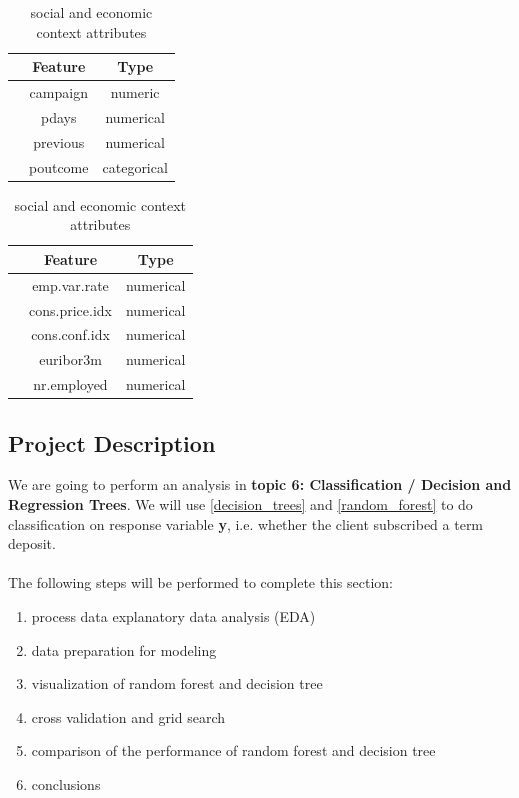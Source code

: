 \documentclass[11pt,a4paper]{article}
\newcounter{magicrownumbers}
\newcommand\rownumber{\stepcounter{magicrownumbers}\arabic{magicrownumbers}}
\begin{document}
    \begin{table}[h]
        \begin{minipage}{.5\linewidth}
            \centering
            \begin{tabular}{r c c}
                 & Feature & Type \\
                \hline \hline
                \rownumber & campaign & numeric \\
                \rownumber & pdays & numerical \\
                \rownumber & previous & numerical \\
                \rownumber & poutcome & categorical \\
            \end{tabular}
            \caption{Other attributes}\label{tab:other}
        \end{minipage}%
        \begin{minipage}{.5\linewidth}
            \centering
            \begin{tabular}{r c c}
                 & Feature & Type \\
                \hline \hline
                \rownumber & emp.var.rate & numerical \\
                \rownumber & cons.price.idx & numerical \\
                \rownumber & cons.conf.idx & numerical \\
                \rownumber & euribor3m & numerical \\
                \rownumber & nr.employed & numerical \\
            \end{tabular}
            \caption{social and economic context attributes}\label{tab:soc.econ}
        \end{minipage}
    \end{table}
    
    \subsection{Project Description}
    We are going to perform an analysis in \textbf{topic 6: Classification / Decision and Regression Trees}. We will use \ref{decision_trees}  and \ref{random_forest}  to do classification on response variable \textbf{y}, i.e. whether the client subscribed a term deposit. \\
    \\
    The following steps will be performed to complete this section:
    \begin{enumerate}
        \item process data explanatory data analysis (EDA)
        \item data preparation for modeling
        \item visualization of random forest and decision tree
        \item cross validation and grid search
        \item comparison of the performance of random forest and decision tree
        \item conclusions
    \end{enumerate}
    
\end{document}
